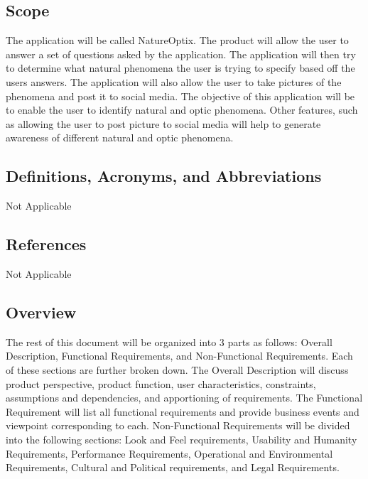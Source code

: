 \documentclass[]{article}
\begin{document}
\subsection{Scope}
\label{sub:scope}

The application will be called NatureOptix.  The product will allow the user to answer a set of questions asked by the application. The application will then try to determine what natural phenomena the user is trying to specify based off the users answers. The application will also allow the user to take pictures of the phenomena and post it to social media. The objective of this application will be to enable the user to identify natural and optic phenomena. Other features, such as allowing the user to post picture to social media will help to generate awareness of different natural and optic phenomena. 


\subsection{Definitions, Acronyms, and Abbreviations}
\label{sub:definitions_acronyms_and_abbreviations}

Not Applicable


\subsection{References}
\label{sub:references}
Not Applicable

\subsection{Overview}
\label{sub:overview}
\indent The rest of this document will be organized into 3 parts as follows: Overall Description, Functional Requirements, and Non-Functional Requirements. Each of these sections are further broken down. The Overall Description will discuss product perspective, product function, user characteristics, constraints, assumptions and dependencies, and apportioning of requirements. The Functional Requirement will list all functional requirements and provide business events and viewpoint corresponding to each. Non-Functional Requirements will be divided into the following sections: Look and Feel requirements, Usability and Humanity Requirements, Performance Requirements, Operational and Environmental Requirements, Cultural and Political requirements, and Legal Requirements. 
\end{document}

